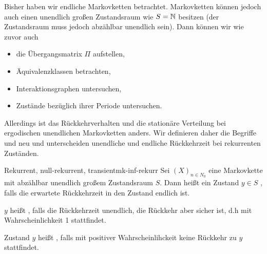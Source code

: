 Bisher haben wir endliche Markovketten betrachtet. Markovketten können jedoch
auch einen unendlich großen Zustandsraum wie $S=\mathbb{N}$ besitzen (der Zustandsraum
muss jedoch abzählbar unendlich sein). Dann können wir wie zuvor auch
\begin{itemize}
\item die Übergangsmatrix $\Pi$ aufstellen,
\item Äquivalenzklassen betrachten,
\item Interaktionsgraphen untersuchen,
\item Zustände bezüglich ihrer Periode untersuchen.
\end{itemize}

Allerdings ist das Rückkehrverhalten und die stationäre Verteilung bei
ergodischen unendlichen Markovketten anders. Wir definieren daher die Begriffe
 und  neu und
unterscheiden unendliche und endliche Rückkehrzeit bei rekurrenten Zuständen.

\begin{definition}{Rekurrent, null-rekurrent, transient}{mk-inf-rekurr}
Sei $(X)_{n\in N_0}$ eine Markovkette mit abzählbar unendlich großem
Zustandsraum $S$. Dann heißt ein Zustand $y\in S$ , falls die
erwartete Rückkehrzeit in den Zustand endlich ist.

$y$ heißt , falls die Rückkehrzeit unendlich, die Rückkehr
aber sicher ist, d.h mit Wahrscheinlichkeit 1 stattfindet.

Zustand $y$ heißt , falls mit positiver Wahrscheinlihckeit keine
Rückkehr zu $y$ stattfindet.
\end{definition}

